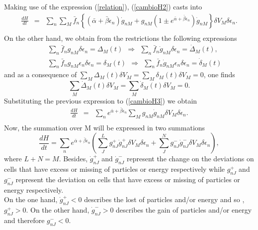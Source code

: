 \documentclass{article}
\begin{document}
Making use of the expression (\ref{relation}),
(\ref{cambioH2}) casts into
\begin{eqnarray}
    \frac{dH}{dt}&=&\sum_n \sum_M \bar{f}_n\left \{ (\bar{\alpha}+\bar{\beta}{\epsilon}_n)\dot{g}_{nM}+ g_{nM}\left(1\pm e^{\bar{\alpha}+\bar{\beta}{\epsilon}_n}\right)\dot{g}_{nM} \right \}\delta V_M \delta \epsilon_n. \nonumber \\
    \label{cambioH3}
\end{eqnarray}{}
On the other hand, we obtain from the restrictions the following expressions
\begin{eqnarray}
    &&\sum_n \bar{f}_n g_{nM} \delta \epsilon_n=\Delta_M(t) \ \  \Rightarrow \ \  \sum_n \bar{f}_n \dot{g}_{nM} \delta \epsilon_n=\dot{\Delta}_M(t), \nonumber \\
    &&\sum_n  \bar{f}_n g_{nM}\epsilon_n \delta \epsilon_n=\delta_M(t) \ \  \Rightarrow \ \  \sum_n \bar{f}_n \dot{g}_{nM}\epsilon_n \delta \epsilon_n=\dot{\delta}_M(t)
\end{eqnarray}{}
and as a consequence of $\sum_M \Delta_M(t) \delta V_M =\sum_M \delta_M(t)\delta V_M =0$, one finds
\begin{equation}
    \sum_M \dot{\Delta}_M(t)\delta V_M =\sum_M \dot{\delta}_{M}(t)\delta V_M =0.
\end{equation}{}
Substituting the previous expression to (\ref{cambioH3}) we obtain
\begin{eqnarray}
   \frac{dH}{dt}&=&  \sum_n e^{\bar{\alpha}+\bar{\beta}\epsilon_n}\sum_M  g_{nM}\dot{g}_{nM}\delta V_M \delta \epsilon_n. \nonumber \\ \label{cambioH4}
\end{eqnarray}{}
Now, the summation over M will be expressed in two summations
\begin{equation}
    \frac{dH}{dt}=\sum_n  e^{\bar{\alpha}+\bar{\beta}\epsilon_n}\left(\sum_J ^{L} g^{+}_{nJ}\dot{g}^{+}_{nJ}\delta V_M \delta \epsilon_n+\sum^{N}_J  g^{-}_{nJ}\dot{g}^{-}_{nJ}\delta V_M \delta \epsilon_n \right), \label{cambioH5}
\end{equation}{}
where $L+N=M$. Besides, $\dot{g}^{+}_{nJ}$ and $\dot{g}^{-}_{nJ}$  represent the change on the deviations on cells that have excess or missing of particles or energy respectively while $g^{+}_{nJ}$ and $g^{-}_{nJ}$ represent the deviation on cells that have excess or missing of particles or energy respectively.\\
On the one hand, $\dot{g}^{+}_{nJ}<0$ describes the lost of particles and/or energy and so , $g^{+}_{nJ}>0$. On the other hand, $\dot{g}^{-}_{nJ}>0$ describes the gain of particles and/or energy and therefore $g^{-}_{nJ}<0$. \\
\end{document}
